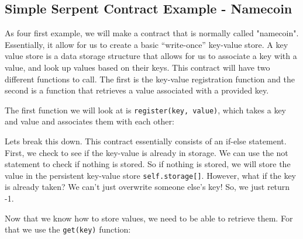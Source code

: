 \documentclass[12pt]{article}
\begin{document}
\subsection{Simple Serpent Contract Example - Namecoin}
As four first example, we will make a contract that is normally called "namecoin". Essentially, it allow for us to create a basic ``write-once'' key-value store. A key value store is a data storage structure that allows for us to associate a key with a value, and look up values based on their keys. This contract will have two different functions to call. The first is the key-value registration function and the second is a function that retrieves a value associated with a provided key.

The first function we will look at is \texttt{register(key, value)}, which takes a key and value and associates them with each other:


Lets break this down. This contract essentially consists of an if-else statement. First, we check to see if the key-value is already in storage. We can use the not statement to check if nothing is stored. So if nothing is stored, we will store the value in the persistent key-value store \texttt{self.storage[]}. However, what if the key is already taken? We can't just overwrite someone else's key! So, we just return -1. 

Now that we know how to store values, we need to be able to retrieve them. For that we use the \texttt{get(key)} function:

\end{document}
